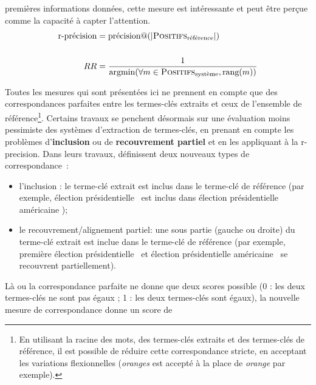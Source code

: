         premières informations données, cette mesure est intéressante et peut
        être perçue comme la capacité à capter l'attention.
        \begin{align}
          \text{r-précision} &= \text{précision}@(|\textsc{Positifs}_{\text{référence}}|) \label{math:rprecision}\\
          \notag \\
          RR &= \frac{1}{\text{argmin}(\forall m \in \textsc{Positifs}_{\text{système}}, \text{rang}(m))} \label{math:reciprocalrank}
        \end{align}

        Toutes les mesures qui sont présentées ici ne prennent en compte que des
        correspondances parfaites entre les termes-clés extraits et ceux de
        l'ensemble de référence\footnote{En utilisant la racine des mots, des
        termes-clés extraits et des termes-clés de référence, il est possible de
        réduire cette correspondance stricte, en acceptant les variations
        flexionnelles (\textit{oranges} est accepté à la place de
        \textit{orange} par exemple).}. Certains travaux se penchent désormais
        sur une évaluation moins pessimiste des systèmes d'extraction de
        termes-clés, en prenant en compte les problèmes d'\textbf{inclusion} ou
        de \textbf{recouvrement partiel} \citep{zesch2009rprecision,
        kim2010rprecision} et en les appliquant à la r-precision. Dans leurs
        travaux, \citet{zesch2009rprecision} définissent deux nouveaux types de
        correspondance~:
        \begin{itemize}
          \item{l'inclusion : le terme-clé extrait est inclus dans le terme-clé
                de référence (par exemple, \og élection présidentielle \fg\ est
                inclus dans \og élection présidentielle américaine \fg);}
          \item{le recouvrement/alignement partiel: une sous partie (gauche ou
                droite) du terme-clé extrait est inclue dans le terme-clé de
                référence (par exemple, \og première élection présidentielle
                \fg\ et \og élection présidentielle américaine \fg\ se
                recouvrent partiellement).}
        \end{itemize}
        Là ou la correspondance parfaite ne donne que deux scores possible (0 :
        les deux termes-clés ne sont pas égaux ; 1 : les deux termes-clés sont
        égaux), la nouvelle mesure de correspondance donne un score de
